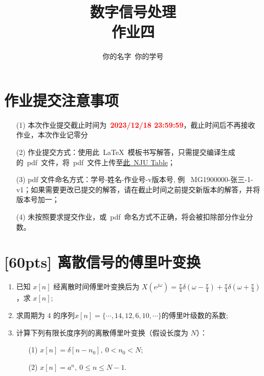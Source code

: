 \documentclass[tikz,a4paper,UTF8]{article}
\numberwithin{equation}{section}
\begin{document}
\title{数字信号处理\\
    作业四}
\author{你的名字\, 你的学号}
\maketitle

\section*{作业提交注意事项}
\begin{tcolorbox}
    \begin{enumerate}
        \item[(1)] 本次作业提交截止时间为~\textcolor{red}{\textbf{2023/12/18  23:59:59}}，截止时间后不再接收作业，本次作业记零分        
        \item[(2)] 作业提交方式：使用此~\LaTeX~模板书写解答，只需提交编译生成的~pdf~文件，将~pdf~文件上传至\href{https://table.nju.edu.cn/dtable/forms/83126334-285c-4153-ba8a-cdc90d24358f/}{此~NJU Table}；
        \item[(3)] pdf 文件命名方式：学号-姓名-作业号-v版本号, 例~ MG1900000-张三-1-v1；如果需要更改已提交的解答，请在截止时间之前提交新版本的解答，并将版本号加一；
        \item[(4)] 未按照要求提交作业，或~pdf~命名方式不正确，将会被扣除部分作业分数。

    \end{enumerate}
\end{tcolorbox}


\newpage
\section{[60pts] 离散信号的傅里叶变换}
\begin{enumerate}
	\item 已知 $x[n]$ 经离散时间傅里叶变换后为 $X(e^{j\omega}) = \frac{\pi}{4} \delta(\omega - \frac{\pi}{4}) + \frac{\pi}{4} \delta(\omega + \frac{\pi}{4})$，求 $x[n]$;
	\item 求周期为 4 的序列$ x[n]=\{\cdots, 14, 12, 6, 10, \cdots\} $的傅里叶级数的系数;
	\item 计算下列有限长度序列的离散傅里叶变换（假设长度为 $N$）：
	\begin{enumerate}
		\item[(1)] $x[n]=\delta[n-n_0],\ 0<n_0<N$;
		\item[(2)] $x[n]=a^n,\ 0\le n\le N-1$.
	\end{enumerate}
\end{enumerate}
\end{document}
